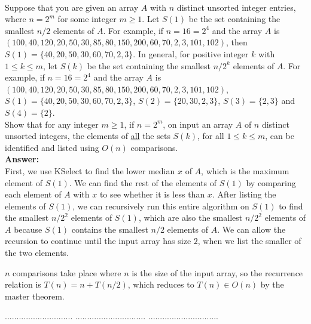 \documentclass[a4paper,11pt]{article}
\begin{document}
\bigskip
{}\\
Suppose that you are given an array $A$ with $n$ distinct unsorted integer entries, where $n=2^m$ for some integer $m \geq 1$. 
Let $S(1)$ be the set containing the smallest $n/2$ elements of $A$. 
For example, if  $n=16=2^4$ and the array $A$ is $(     100, 40, 120, 20, 50, 30, 85, 80, 150, 200, 60, 70, 2,3, 101, 102                )$, 
then $S(1)= \{  40, 20, 50, 30, 60, 70 ,2 ,3  \}$. 
In general, for positive integer $k$ with $1\leq k \leq m$,
let $S(k)$ be the set containing the smallest $n/2^k$ elements of $A$. 
For example, if $n=16=2^4$ and the array $A$ is $(     100, 40, 120, 20, 50, 30, 85, 80, 150, 200, 60, 70, 2,3, 101, 102                )$, 
$S(1) =  \{  40, 20, 50, 30, 60, 70 ,2 ,3  \}$, $S(2) =  \{   20, 30,2 ,3  \}$, $S(3) =  \{  2 ,3  \}$ 
and $S(4) =  \{  2 \}$.\\
Show that for any integer $m \geq 1$, if $n=2^m$, on input an array $A$ of     $n$ 
 distinct unsorted integers, 
the elements of \underline{all} the sets $S(k)$, for all $1\leq k \leq m$,
can be identified and listed using $O(n)$ comparisons.\\
{\bf Answer:}\\
First, we use KSelect to find the lower median $x$ of $A$, which is the maximum element of $S(1)$. We can find the rest of the elements of $S(1)$ by comparing each element of $A$ with $x$ to see whether it is less than $x$. After listing the elements of $S(1)$, we can recursively run this entire algorithm on $S(1)$ to find the smallest $n/2^2$ elements of $S(1)$, which are also the smallest $n/2^2$ elements of $A$ because $S(1)$ contains the smallest $n/2$ elements of $A$. We can allow the recursion to continue until the input array has size $2$, when we list the smaller of the two elements. \par
$n$ comparisons take place where $n$ is the size of the input array, so the recurrence relation is $T(n) = n + T(n/2)$, which reduces to $T(n) \in O(n)$ by the master theorem.

\pagebreak
{} $.............................$
 $..............................$
          $..............................$\\
\end{document}

